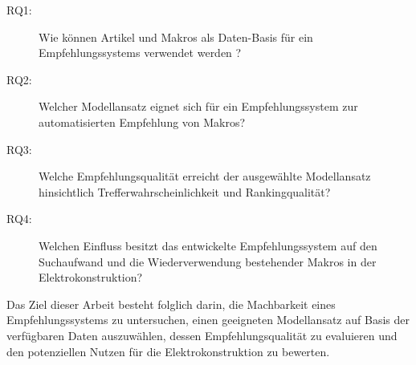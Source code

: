 \begin{description} 
  \item[RQ1:] Wie können Artikel und Makros als Daten-Basis für ein Empfehlungssystems verwendet werden ? 
  \item[RQ2:] Welcher Modellansatz eignet sich für ein Empfehlungssystem zur automatisierten Empfehlung von Makros? 
  \item[RQ3:] Welche Empfehlungsqualität erreicht der ausgewählte Modellansatz hinsichtlich Trefferwahrscheinlichkeit und Rankingqualität? 
  \item[RQ4:] Welchen Einfluss besitzt das entwickelte Empfehlungssystem auf den Suchaufwand und die Wiederverwendung bestehender Makros in der Elektrokonstruktion? 
\end{description} 

Das Ziel dieser Arbeit besteht folglich darin, die Machbarkeit eines Empfehlungssystems zu untersuchen, einen geeigneten Modellansatz auf Basis der verfügbaren Daten auszuwählen, 
dessen Empfehlungsqualität zu evaluieren und den potenziellen Nutzen für die Elektrokonstruktion zu bewerten.
